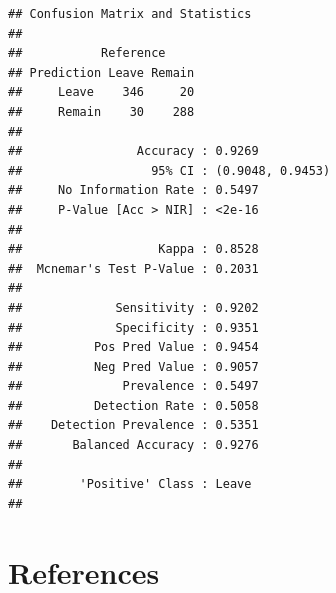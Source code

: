 \documentclass[10pt  ,usenames, dvipsnames]{article}\usepackage[]{graphicx}\usepackage[]{color}
\makeatletter
\newenvironment{kframe}{%
 \def\at@end@of@kframe{}%
 \ifinner\ifhmode%
  \def\at@end@of@kframe{\end{minipage}}%
  \begin{minipage}{\columnwidth}%
 \fi\fi%
 \def\FrameCommand##1{\hskip\@totalleftmargin \hskip-\fboxsep
 \colorbox{shadecolor}{##1}\hskip-\fboxsep
     \hskip-\linewidth \hskip-\@totalleftmargin \hskip\columnwidth}%
 \MakeFramed {\advance\hsize-\width
   \@totalleftmargin\z@ \linewidth\hsize
   \@setminipage}}%
 {\par\unskip\endMakeFramed%
 \at@end@of@kframe}
\newenvironment{knitrout}{}{} %
\makeatother
\begin{document}
\begin{knitrout}
\color{fgcolor}\begin{kframe}
\begin{verbatim}
## Confusion Matrix and Statistics
## 
##           Reference
## Prediction Leave Remain
##     Leave    346     20
##     Remain    30    288
##                                           
##                Accuracy : 0.9269          
##                  95% CI : (0.9048, 0.9453)
##     No Information Rate : 0.5497          
##     P-Value [Acc > NIR] : <2e-16          
##                                           
##                   Kappa : 0.8528          
##  Mcnemar's Test P-Value : 0.2031          
##                                           
##             Sensitivity : 0.9202          
##             Specificity : 0.9351          
##          Pos Pred Value : 0.9454          
##          Neg Pred Value : 0.9057          
##              Prevalence : 0.5497          
##          Detection Rate : 0.5058          
##    Detection Prevalence : 0.5351          
##       Balanced Accuracy : 0.9276          
##                                           
##        'Positive' Class : Leave           
## 
\end{verbatim}
\end{kframe}
\end{knitrout}


\clearpage




\clearpage

\section{References}\label{pubs}

\printbibliography[heading =none]


\clearpage
\end{document}
